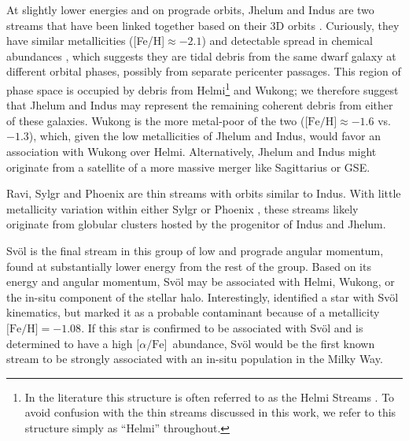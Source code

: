 \documentclass[twocolumn]{aastex63}
\newcommand{\feh}{\ensuremath{\textrm{[Fe/H]}}}
\newcommand{\afe}{\ensuremath{\textrm{[$\alpha$/Fe]}}}
\begin{document}
At slightly lower energies and on prograde orbits, Jhelum and Indus are two streams that have been linked together based on their 3D orbits \citep{bonaca2019b}.
Curiously, they have similar metallicities ([Fe/H]$\approx-2.1$) and detectable spread in chemical abundances \citep{ji2020}, which suggests they are tidal debris from the same dwarf galaxy at different orbital phases, possibly from separate pericenter passages.
This region of phase space is occupied by debris from Helmi\footnote{In the literature this structure is often referred to as the Helmi Streams \citep{helmi1999}. To avoid confusion with the thin streams discussed in this work, we refer to this structure simply as ``Helmi'' throughout.} and Wukong; we therefore suggest that Jhelum and Indus may represent the remaining coherent debris from either of these galaxies.
Wukong is the more metal-poor of the two ($\feh\approx-1.6$ vs. $-1.3$), which, given the low metallicities of Jhelum and Indus, would favor an association with Wukong over Helmi.
Alternatively, Jhelum and Indus might originate from a satellite of a more massive merger like Sagittarius or GSE.


Ravi, Sylgr and Phoenix are thin streams with orbits similar to Indus.
With little metallicity variation within either Sylgr or Phoenix \citep{ibata2019, wan2020}, these streams likely originate from globular clusters hosted by the progenitor of Indus and Jhelum.

Sv\" ol is the final stream in this group of low and prograde angular momentum, found at substantially lower energy from the rest of the group.
Based on its energy and angular momentum, Sv\" ol may be associated with Helmi, Wukong, or the in-situ component of the stellar halo.
Interestingly, \citet{ibata2019} identified a star with Sv\" ol kinematics, but marked it as a probable contaminant because of a metallicity $\feh=-1.08$.
If this star is confirmed to be associated with Sv\" ol and is determined to have a high \afe\ abundance, Sv\" ol would be the first known stream to be strongly associated with an in-situ population in the Milky Way. 
\end{document}
